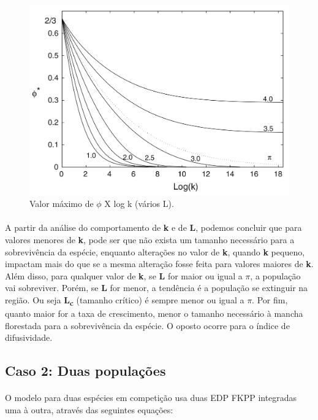 \documentclass{article}
\begin{document}
	\begin{figure}[h]
		\centering
		\includegraphics[scale=0.2]{MaxV-ManyL}
		\caption{Valor máximo de $\phi$ X log k (vários L).}
		\label{fig:maxvmanyl}
	\end{figure}
	
	\paragraph{}
	A partir da análise do comportamento de \textbf{k} e de \textbf{L}, podemos concluir que para valores menores de \textbf{k}, pode ser que não exista um tamanho necessário para a sobrevivência da espécie, enquanto alterações no valor de \textbf{k}, quando \textbf{k} pequeno, impactam mais do que se a mesma alteração fosse feita para valores maiores de \textbf{k}. Além disso, para qualquer valor de \textbf{k}, se \textbf{L} for maior ou igual a $\pi$, a população vai sobreviver. Porém, se \textbf{L} for menor, a tendência é a população se extinguir na região. Ou seja \textbf{L\textsubscript{c}} (tamanho crítico) é sempre menor ou igual a $\pi$. Por fim, quanto maior for a taxa de crescimento, menor o tamanho necessário à mancha florestada para a sobrevivência da espécie. O oposto ocorre para o índice de difusividade.
	
	\subsection{Caso 2: Duas populações}
	
	\paragraph{}
	O modelo para duas espécies em competição usa duas EDP FKPP integradas uma à outra, através das seguintes equações:
	
\end{document}
